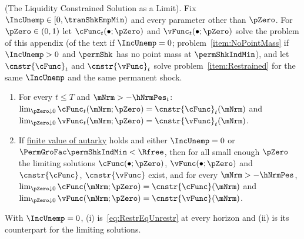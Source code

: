 \documentclass[\econtexRoot/BufferStockTheory]{subfiles}
\begin{document}
\begin{theorem}(The Liquidity Constrained Solution as a Limit).\label{thm:LiqConstrLimitPositiveMinimum}
Fix $\IncUnemp\in[0,\tranShkEmpMin)$ and every parameter other than $\pZero$.
For $\pZero\in(0,1)$ let $\cFunc_{t}(\bullet;\pZero)$ and $\vFunc_{t}(\bullet;\pZero)$ solve the problem of this appendix (of the text if $\IncUnemp=0$; problem~\ref{item:NoPointMass} if $\IncUnemp>0$ and $\permShk$ has no point mass at $\permShkIndMin$), and let $\cnstr{\cFunc}_{t}$ and $\cnstr{\vFunc}_{t}$ solve problem~\ref{item:Restrained} for the same $\IncUnemp$ and the same permanent shock.
\begin{enumerate}[label=(\roman*)]
\item For every $t\leq T$ and $\mNrm>-\hNrmPes_{t}$: $\lim_{\pZero\downarrow 0}\cFunc_{t}(\mNrm;\pZero)=\cnstr{\cFunc}_{t}(\mNrm)$ and $\lim_{\pZero\downarrow 0}\vFunc_{t}(\mNrm;\pZero)=\cnstr{\vFunc}_{t}(\mNrm)$.
\item If \hyperlink{FVAC}{finite value of autarky} holds and either $\IncUnemp=0$ or $\PermGroFac\permShkIndMin<\Rfree$, then for all small enough $\pZero$ the limiting solutions $\cFunc(\bullet;\pZero)$, $\vFunc(\bullet;\pZero)$ and $\cnstr{\cFunc}$, $\cnstr{\vFunc}$ exist, and for every $\mNrm>-\hNrmPes$, $\lim_{\pZero\downarrow 0}\cFunc(\mNrm;\pZero)=\cnstr{\cFunc}(\mNrm)$ and $\lim_{\pZero\downarrow 0}\vFunc(\mNrm;\pZero)=\cnstr{\vFunc}(\mNrm)$.
\end{enumerate}
With $\IncUnemp=0$, (i) is~\eqref{eq:RestrEqUnrestr} at every horizon and (ii) is its counterpart for the limiting solutions.
\end{theorem}
\end{document}
